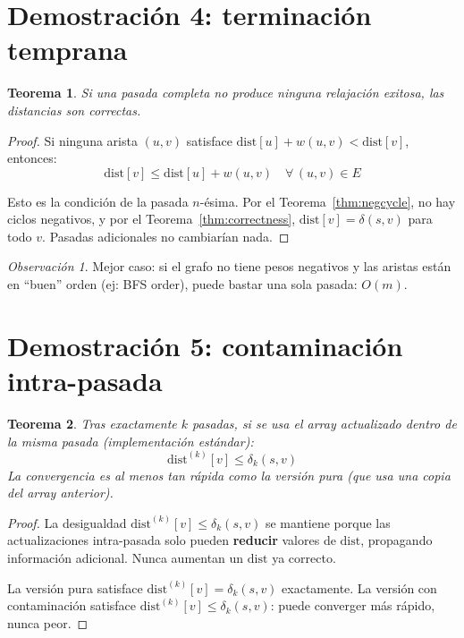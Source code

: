 \documentclass[11pt, letterpaper]{article}
\theoremstyle{definition}
\theoremstyle{plain}
\newtheorem{theorem}{Teorema}[section]
\theoremstyle{remark}
\newtheorem{remark}{Observación}[section]
\begin{document}
\section{Demostración 4: terminación temprana}

\begin{theorem}\label{thm:early}
Si una pasada completa no produce ninguna relajación exitosa, las
distancias son correctas.
\end{theorem}

\begin{proof}
Si ninguna arista $(u,v)$ satisface
$\mathrm{dist}[u] + w(u,v) < \mathrm{dist}[v]$, entonces:
\[
  \mathrm{dist}[v] \leq \mathrm{dist}[u] + w(u,v)
  \quad \forall\, (u,v) \in E
\]

Esto es la condición de la pasada $n$-ésima. Por el
Teorema~\ref{thm:negcycle}, no hay ciclos negativos, y por el
Teorema~\ref{thm:correctness},
$\mathrm{dist}[v] = \delta(s,v)$ para todo $v$. Pasadas adicionales
no cambiarían nada.
\end{proof}

\begin{remark}
Mejor caso: si el grafo no tiene pesos negativos y las aristas están
en ``buen'' orden (ej: BFS order), puede bastar una sola pasada:
$O(m)$.
\end{remark}

\section{Demostración 5: contaminación intra-pasada}

\begin{theorem}\label{thm:intrapass}
Tras exactamente $k$ pasadas, si se usa el array actualizado dentro
de la misma pasada (implementación estándar):
\[
  \mathrm{dist}^{(k)}[v] \leq \delta_k(s,v)
\]
La convergencia es al menos tan rápida como la versión pura (que usa
una copia del array anterior).
\end{theorem}

\begin{proof}
La desigualdad $\mathrm{dist}^{(k)}[v] \leq \delta_k(s,v)$ se
mantiene porque las actualizaciones intra-pasada solo pueden
\textbf{reducir} valores de $\mathrm{dist}$, propagando información
adicional. Nunca aumentan un $\mathrm{dist}$ ya correcto.

La versión pura satisface $\mathrm{dist}^{(k)}[v] = \delta_k(s,v)$
exactamente. La versión con contaminación satisface
$\mathrm{dist}^{(k)}[v] \leq \delta_k(s,v)$: puede converger más
rápido, nunca peor.
\end{proof}
\end{document}
